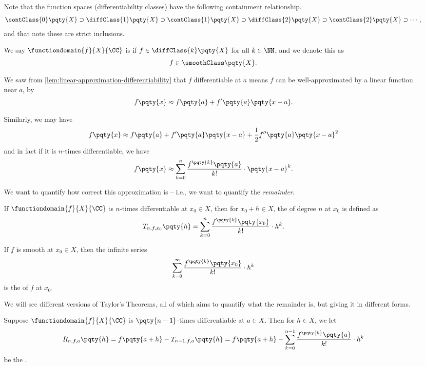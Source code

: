 Note that the function spaces (differentiability classes) have the following containment relationship.
\[
    \contClass{0}\pqty{X} \supset \diffClass{1}\pqty{X} \supset \contClass{1}\pqty{X} \supset \diffClass{2}\pqty{X} \supset \contClass{2}\pqty{X} \supset \cdots,
\]
and that note these are strict inclusions.

\begin{definition}[Smooth]
    \label{def:smooth}%
    We say \(\functiondomain{f}{X}{\CC}\) is  if \(f \in \diffClass{k}\pqty{X}\) for all \(k \in \NN\), and we denote this as
    \[
        f \in \smoothClass \pqty{X}.
    \]
\end{definition}

We saw from \autoref{lem:linear-approximation-differentiability} that \(f\) differentiable at \(a\) means \(f\) can be well-approximated by a linear function near \(a\), by
\[
    f\pqty{x} \approx f\pqty{a} + f'\pqty{a} \pqty{x - a}.
\]

Similarly, we may have
\[
    f\pqty{x} \approx f\pqty{a} + f'\pqty{a} \pqty{x - a} + \frac{1}{2} f''\pqty{a} \pqty{x - a}^2
\]
and in fact if it is \(n\)-times differentiable, we have
\[
    f\pqty{x} \approx \sum_{k = 0}^{n} \frac{f^{\pqty{k}} \pqty{a}}{k!} \cdot \pqty{x - a}^{k}.
\]

We want to quantify how correct this approximation is -- i.e., we want to quantify the \emph{remainder}.

\begin{definition}
    \label{def:taylor-polynomial-series}%
    If \(\functiondomain{f}{X}{\CC}\) is \(n\)-times differentiable at \(x_0 \in X\), then for \(x_0 + h \in X\), the  of degree \(n\) at \(x_0\) is defined as
    \[
        T_{n, f, x_0} \pqty{h} = \sum_{k = 0}^{n} \frac{f^{\pqty{k}} \pqty{x_0}}{k!} \cdot h^{k}.
    \]

    If \(f\) is smooth at \(x_0 \in X\), then the infinite series
    \[
        \sum_{k = 0}^{\infty} \frac{f^{\pqty{k}} \pqty{x_0}}{k!} \cdot h^{k}
    \]
    is the  of \(f\) at \(x_0\).
\end{definition}

We will see different versions of Taylor's Theorems, all of which aims to quantify what the remainder is, but giving it in different forms.

\begin{definition}
    Suppose \(\functiondomain{f}{X}{\CC}\) is \(\pqty{n - 1}\)-times differentiable at \(a \in X\). Then for \(h \in X\), we let
    \[
        R_{n, f, a} \pqty{h} = f\pqty{a + h} - T_{n - 1, f, a} \pqty{h} = f\pqty{a + h} - \sum_{k = 0}^{n - 1} \frac{f^{\pqty{k}} \pqty{a}}{k!} \cdot h^k
    \]
    be the .
\end{definition}

